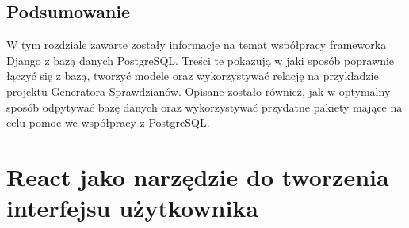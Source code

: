 \documentclass[oneside,polski,logo,indent]{amuthesis}
\begin{document}
\section{Podsumowanie}
W tym rozdziale zawarte zostały informacje na temat współpracy frameworka Django z bazą danych PostgreSQL. Treści te pokazują w jaki sposób poprawnie łączyć się z bazą, tworzyć modele oraz wykorzystywać relację na przykładzie projektu Generatora Sprawdzianów. Opisane zostało również, jak w optymalny sposób odpytywać bazę danych oraz wykorzystywać przydatne pakiety mające na celu pomoc we współpracy z PostgreSQL.

\chapter {React jako narzędzie do tworzenia interfejsu użytkownika}
\end{document}
